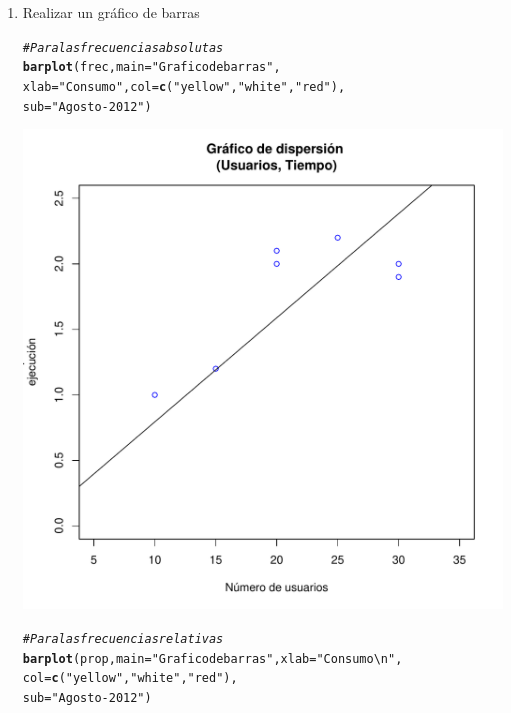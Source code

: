 \documentclass[12pt,letterpaper]{article}\usepackage[]{graphicx}\usepackage[]{color}
\makeatletter
\def\maxwidth{ %
  \ifdim\Gin@nat@width>\linewidth
    \linewidth
  \else
    \Gin@nat@width
  \fi
}
\newcommand{\hlstr}[1]{\textcolor[rgb]{0.192,0.494,0.8}{#1}}%
\newcommand{\hlcom}[1]{\textcolor[rgb]{0.678,0.584,0.686}{\textit{#1}}}%
\newcommand{\hlstd}[1]{\textcolor[rgb]{0.345,0.345,0.345}{#1}}%
\newcommand{\hlkwc}[1]{\textcolor[rgb]{0.333,0.667,0.333}{#1}}%
\newcommand{\hlkwd}[1]{\textcolor[rgb]{0.737,0.353,0.396}{\textbf{#1}}}%
\newenvironment{kframe}{%
 \def\at@end@of@kframe{}%
 \ifinner\ifhmode%
  \def\at@end@of@kframe{\end{minipage}}%
  \begin{minipage}{\columnwidth}%
 \fi\fi%
 \def\FrameCommand##1{\hskip\@totalleftmargin \hskip-\fboxsep
 \colorbox{shadecolor}{##1}\hskip-\fboxsep
     \hskip-\linewidth \hskip-\@totalleftmargin \hskip\columnwidth}%
 \MakeFramed {\advance\hsize-\width
   \@totalleftmargin\z@ \linewidth\hsize
   \@setminipage}}%
 {\par\unskip\endMakeFramed%
 \at@end@of@kframe}
\newenvironment{knitrout}{}{} %
\makeatother
\begin{document}
\begin{enumerate}
\item Realizar un gr\'afico de barras
\begin{knitrout}
\color{fgcolor}\begin{kframe}
\begin{alltt}
\hlcom{# Para las frecuencias absolutas }
\hlkwd{barplot}\hlstd{(frec,} \hlkwc{main}\hlstd{=}\hlstr{"Grafico de barras"}\hlstd{,}
        \hlkwc{xlab}\hlstd{=}\hlstr{"Consumo"}\hlstd{,} \hlkwc{col}\hlstd{=}\hlkwd{c}\hlstd{(}\hlstr{"yellow"}\hlstd{,} \hlstr{"white"}\hlstd{,} \hlstr{"red"}\hlstd{),}
        \hlkwc{sub}\hlstd{=}\hlstr{"Agosto-2012"}\hlstd{)}
\end{alltt}
\end{kframe}
\includegraphics[width=\maxwidth]{figure/unnamed-chunk-12-1} 
\begin{kframe}\begin{alltt}
\hlcom{# Para las frecuencias relativas }
\hlkwd{barplot}\hlstd{(prop,} \hlkwc{main}\hlstd{=}\hlstr{"Grafico de barras"}\hlstd{,} \hlkwc{xlab}\hlstd{=}\hlstr{" Consumo\textbackslash{}n"}\hlstd{,}
        \hlkwc{col}\hlstd{=}\hlkwd{c}\hlstd{(}\hlstr{"yellow"}\hlstd{,}\hlstr{"white"}\hlstd{,} \hlstr{"red"}\hlstd{),}
        \hlkwc{sub}\hlstd{=}\hlstr{"Agosto-2012"}\hlstd{)}
\end{alltt}
\end{kframe}

\end{knitrout}
\end{enumerate}
\end{document}
